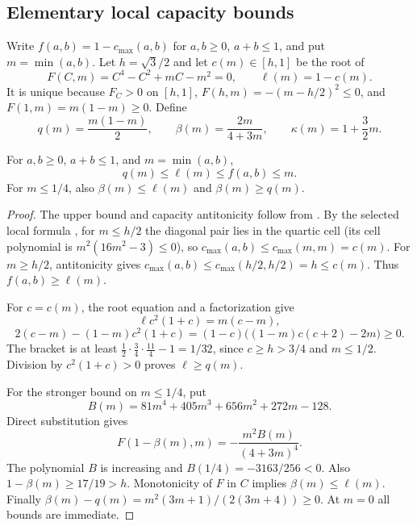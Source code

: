 \subsection{Elementary local capacity bounds}
Write $f(a,b)=1-c_{\max}(a,b)$ for $a,b\ge0$, $a+b\le1$, and put
$m=\min(a,b)$. Let $h=\sqrt3/2$ and let $c(m)\in[h,1]$ be the root of
\[
 F(C,m)=C^4-C^2+mC-m^2=0,\qquad \ell(m)=1-c(m).
\]
It is unique because $F_C>0$ on $[h,1]$,
$F(h,m)=-(m-h/2)^2\le0$, and $F(1,m)=m(1-m)\ge0$.
Define
\[
 q(m)=\frac{m(1-m)}2,\qquad
 \beta(m)=\frac{2m}{4+3m},\qquad \kappa(m)=1+\frac32m.
\]
\begin{lemma}
\label{lem:bc-capacity-tools}
For $a,b\ge0$, $a+b\le1$, and $m=\min(a,b)$,
\[
 q(m)\le\ell(m)\le f(a,b)\le m.
\]
For $m\le1/4$, also $\beta(m)\le\ell(m)$ and $\beta(m)\ge q(m)$.
\end{lemma}
\begin{proof}
The upper bound and capacity antitonicity follow from
. By the selected local formula
, for $m\le h/2$ the diagonal pair lies
in the quartic cell (its cell polynomial is $m^2(16m^2-3)\le0$), so
$c_{\max}(a,b)\le c_{\max}(m,m)=c(m)$. For $m\ge h/2$,
antitonicity gives $c_{\max}(a,b)\le c_{\max}(h/2,h/2)=h\le c(m)$.
Thus $f(a,b)\ge\ell(m)$.

For $c=c(m)$, the root equation and a factorization give
\[
 \ell c^2(1+c)=m(c-m),
\]
\[
 2(c-m)-(1-m)c^2(1+c)
 =(1-c)\bigl((1-m)c(c+2)-2m\bigr)\ge0.
\]
The bracket is at least
$\tfrac12\cdot\tfrac34\cdot\tfrac{11}4-1=1/32$, since $c\ge h>3/4$
and $m\le1/2$. Division by $c^2(1+c)>0$ proves $\ell\ge q(m)$.

For the stronger bound on $m\le1/4$, put
\[
 B(m)=81m^4+405m^3+656m^2+272m-128.
\]
Direct substitution gives
\[
 F(1-\beta(m),m)=-\frac{m^2B(m)}{(4+3m)^4}.
\]
The polynomial $B$ is increasing and $B(1/4)=-3163/256<0$.
Also $1-\beta(m)\ge17/19>h$. Monotonicity of $F$ in $C$ implies
$\beta(m)\le\ell(m)$. Finally
$\beta(m)-q(m)=m^2(3m+1)/(2(3m+4))\ge0$. At $m=0$ all bounds are immediate.
\end{proof}

